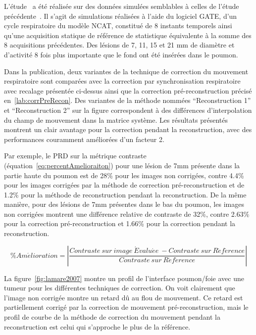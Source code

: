 L'étude~\cite{lamare2007list} a été réalisée sur des données simulées semblables à celles de l'étude précédente~\cite{lamare2007respiratory}. Il s'agit de simulations réalisées à l'aide du logiciel GATE, d'un cycle respiratoire du modèle NCAT, constitué de 8 instants temporels ainsi qu'une acquisition statique de référence de statistique équivalente à la somme des 8 acquisitions précédentes. Des lésions de 7, 11, 15 et 21 mm de diamètre et d'activité 8 fois plus importante que le fond ont été insérées dans le poumon.
 
Dans la publication, deux variantes de la technique de correction du mouvement respiratoire sont comparées avec la correction par synchronisation respiratoire avec recalage présentée ci-dessus ainsi que la correction pré-reconstruction précisé en~\ref{lab:corrPreRecon}. Des variantes de la méthode nommées ``Reconstruction 1'' et ``Reconstruction 2'' sur la figure correspondent à des différences d'interpolation du champ de mouvement dans la matrice système. Les résultats présentés montrent un clair avantage pour la correction pendant la reconstruction, avec des performances couramment améliorées d'un facteur 2. 

Par exemple, le PRD sur la métrique contraste (équation~\ref{eq:percentAmelioraiton}) pour une lésion de 7mm présente dans la partie haute du poumon est de 28\% pour les images non corrigées, contre 4.4\% pour les images corrigées par la méthode de correction pré-reconstruction et de 1.2\% pour la méthode de reconstruction pendant la reconstruction. De la même manière, pour des lésions de 7mm présentes dans le bas du poumon, les images non corrigées montrent une différence relative de contraste de 32\%, contre 2.63\% pour la correction pré-reconstruction et 1.66\% pour la correction pendant la reconstruction.


\begin{equation}
 \label{eq:percentAmelioraiton}
 \% Am\acute{e}lioration = \left| \frac{Contraste~sur~image~\acute{E}valu\acute{e}e~-Contraste~sur~R\acute{e}f\acute{e}rence}{Contraste~sur~R\acute{e}f\acute{e}rence} \right|
\end{equation}

La figure~\ref{fig:lamare2007} montre un profil de l'interface poumon/foie avec une tumeur pour les différentes techniques de correction. On voit clairement que l'image non corrigée montre un retard dû au flou de mouvement. Ce retard est partiellement corrigé par la correction de mouvement pré-reconstruction, mais le profil de courbe de la méthode de correction du mouvement pendant la reconstruction est celui qui s'approche le plus de la référence.


